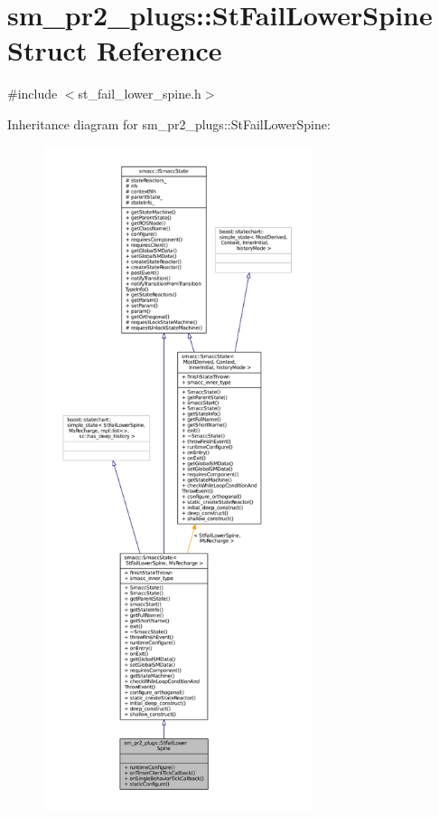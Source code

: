 \hypertarget{structsm__pr2__plugs_1_1StFailLowerSpine}{}\section{sm\+\_\+pr2\+\_\+plugs\+:\+:St\+Fail\+Lower\+Spine Struct Reference}
\label{structsm__pr2__plugs_1_1StFailLowerSpine}


{\ttfamily \#include $<$st\+\_\+fail\+\_\+lower\+\_\+spine.\+h$>$}



Inheritance diagram for sm\+\_\+pr2\+\_\+plugs\+:\+:St\+Fail\+Lower\+Spine\+:
\nopagebreak
\begin{figure}[H]
\begin{center}
\leavevmode
\includegraphics[height=550pt]{structsm__pr2__plugs_1_1StFailLowerSpine__inherit__graph}
\end{center}
\end{figure}


